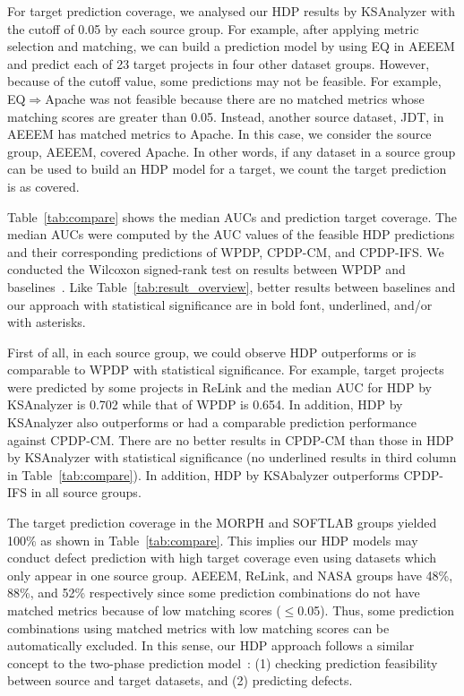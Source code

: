 For target prediction coverage, we analysed our HDP results by KSAnalyzer with
the cutoff of 0.05 by each source group. For example, after applying
metric selection and matching, we can build a prediction model by using EQ in
AEEEM and predict each of 23 target projects in four other dataset
groups. However, because of the cutoff value, some predictions may not be
feasible. For example, EQ$\Rightarrow$Apache was not feasible because there are
no matched metrics whose matching scores are greater than 0.05.
Instead, another source dataset, JDT, in AEEEM has
matched metrics to Apache. In this case, we consider
the source group, AEEEM, covered Apache. In other words, if
any dataset in a source group can be used to build an HDP model for a target, we
count the target prediction is as covered.

Table~\ref{tab:compare} shows the median AUCs and
prediction target coverage. The median AUCs were computed by the AUC
values of the feasible HDP predictions and their corresponding predictions of
WPDP, CPDP-CM, and CPDP-IFS. We conducted the Wilcoxon
signed-rank test on results between WPDP and baselines~\cite{Wilcoxon45}. Like
Table~\ref{tab:result_overview}, better results between baselines and our
approach with statistical significance are in bold font, underlined, and/or with
asterisks.%

First of all, in each source group, we could observe HDP outperforms or is
comparable to WPDP with statistical significance.
For example, target projects were predicted by some projects in ReLink and
the median AUC for HDP by KSAnalyzer is 0.702 while that of
WPDP is 0.654. In addition,
HDP by KSAnalyzer also
outperforms or had a comparable prediction performance against CPDP-CM.
There are no better results in CPDP-CM
than those in HDP by KSAnalyzer with statistical significance (no
underlined results in third column in Table~\ref{tab:compare}). In addition, HDP
by KSAbalyzer outperforms CPDP-IFS in all source groups.

The target prediction coverage in the MORPH and SOFTLAB groups yielded 100\% as
shown in Table~\ref{tab:compare}. This implies our HDP models may conduct defect
prediction with high target coverage even using datasets which only appear in
one source group. AEEEM, ReLink, and NASA groups have 48\%, 88\%, and 52\% respectively
since some prediction combinations do not have matched metrics because of low matching scores ($\leq$0.05).
Thus, some prediction combinations
using matched metrics with low matching scores can be automatically excluded. In
this sense, our HDP approach follows a similar concept to the two-phase
prediction model~\cite{Kim13}: (1) checking prediction feasibility between
source and target datasets, and (2) predicting defects.


